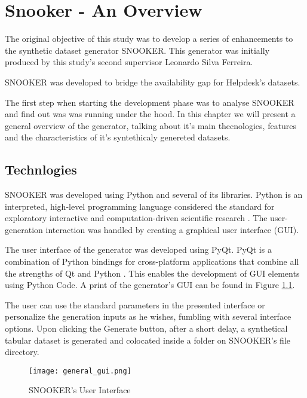 \chapter{Snooker - An Overview}
\label{chap:Snooker}

The original objective of this study was to develop a series of enhancements to the synthetic dataset generator SNOOKER. This generator was initially produced by this study's second supervisor Leonardo Silva Ferreira.

SNOOKER was developed to bridge the availability gap for Helpdesk's datasets.

The first step when starting the development phase was to analyse SNOOKER and find out was was running under the hood. In this chapter we will present a general overview of the generator, talking about it's main thecnologies, features and the characteristics of it's syntethicaly genereted datasets.

\section{Technlogies}

SNOOKER was developed using Python and several of its libraries. Python is an interpreted, high-level programming language considered the standard for exploratory interactive and computation-driven scientific research \cite{5725235}. The user-generation interaction was handled by creating a graphical user interface (GUI).

The user interface of the generator was developed using PyQt. PyQt is a combination of Python bindings for cross-platform applications that combine all the strengths of Qt and Python \cite{siahaan2019postgresql}. This enables the development of GUI elements using Python Code. A print of the generator's GUI can be found in Figure \ref{fig:general_gui}.

The user can use the standard parameters in the presented interface or personalize the generation inputs as he wishes, fumbling with several interface options. Upon clicking the Generate button, after a short delay, a synthetical tabular dataset is generated and colocated inside a folder on SNOOKER's file directory.

\begin{figure}[t]
  \begin{center}
    \leavevmode
    \texttt{[image: general\_gui.png]}
    \caption{SNOOKER's User Interface}
    \label{fig:general_gui}
  \end{center}
\end{figure}

